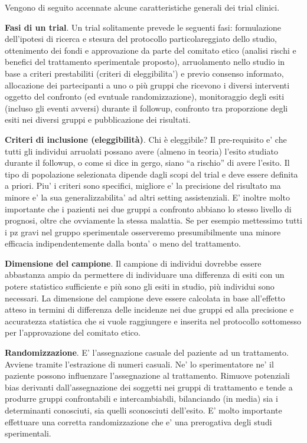 \documentclass[]{book}
\begin{document}
Vengono di seguito accennate alcune caratteristiche generali dei trial clinici.

\textbf{Fasi di un trial}. Un trial solitamente prevede le seguenti fasi: formulazione dell'ipotesi di ricerca e stesura del protocollo particolareggiato dello studio, ottenimento dei fondi e approvazione da parte del comitato etico (analisi rischi e benefici del trattamento sperimentale proposto), arruolamento nello studio in base a criteri prestabiliti (criteri di eleggibilita') e previo consenso informato, allocazione dei partecipanti a uno o più gruppi che ricevono i diversi interventi oggetto del confronto (ed evntuale randomizzazione), monitoraggio degli esiti (incluso gli eventi avversi) durante il followup, confronto tra proporzione degli esiti nei diversi gruppi e pubblicazione dei risultati.

\textbf{Criteri di inclusione (eleggibilità)}. Chi è eleggibile? Il pre-requisito e' che tutti gli individui arruolati possano avere (almeno in teoria) l'esito studiato durante il followup, o come si dice in gergo, siano ``a rischio'' di avere l'esito. Il tipo di popolazione selezionata dipende dagli scopi del trial e deve essere definita a priori. Piu' i criteri sono specifici, migliore e' la precisione del risultato ma minore e' la sua generalizzabilita' ad altri setting assistenziali. E' inoltre molto importante che i pazienti nei due gruppi a confronto abbiano lo stesso livello di prognosi, oltre che ovviamente la stessa malattia. Se per esempio mettessimo tutti i pz gravi nel gruppo sperimentale osserveremo presumibilmente una minore efficacia indipendentemente dalla bonta' o meno del trattamento.

\textbf{Dimensione del campione}. Il campione di individui dovrebbe essere abbastanza ampio da permettere di individuare una differenza di esiti con un potere statistico sufficiente e più sono gli esiti in studio, più individui sono necessari. La dimensione del campione deve essere calcolata in base all'effetto atteso in termini di differenza delle incidenze nei due gruppi ed alla precisione e accuratezza statistica che si vuole raggiungere e inserita nel protocollo sottomesso per l'approvazione del comitato etico.

\textbf{Randomizzazione}. E' l'assegnazione casuale del paziente ad un trattamento. Avviene tramite l'estrazione di numeri casuali. Ne' lo sperimentatore ne' il paziente possono influenzare l'assegnazione al trattamento. Rimuove potenziali bias derivanti dall'assegnazione dei soggetti nei gruppi di trattamento e tende a produrre gruppi confrontabili e intercambiabili, bilanciando (in media) sia i determinanti conosciuti, sia quelli sconosciuti dell'esito. E' molto importante effettuare una corretta randomizzazione che e' una prerogativa degli studi sperimentali.
\end{document}
